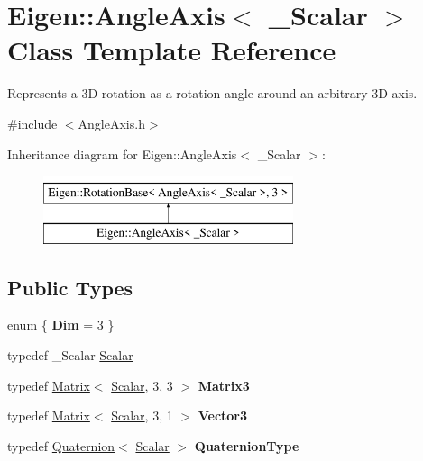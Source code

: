 \hypertarget{class_eigen_1_1_angle_axis}{}\section{Eigen\+::Angle\+Axis$<$ \+\_\+\+Scalar $>$ Class Template Reference}
\label{class_eigen_1_1_angle_axis}


Represents a 3D rotation as a rotation angle around an arbitrary 3D axis.  




{\ttfamily \#include $<$Angle\+Axis.\+h$>$}

Inheritance diagram for Eigen\+::Angle\+Axis$<$ \+\_\+\+Scalar $>$\+:\begin{figure}[H]
\begin{center}
\leavevmode
\includegraphics[height=2.000000cm]{class_eigen_1_1_angle_axis}
\end{center}
\end{figure}
\subsection*{Public Types}
\begin{DoxyCompactItemize}
\item 
\mbox{\label{class_eigen_1_1_angle_axis_aa4d3ccec7f40e12980333eb18a2315ab}} 
enum \{ {\bfseries Dim} = 3
 \}
\item 
typedef \+\_\+\+Scalar \mbox{\hyperlink{class_eigen_1_1_angle_axis_acd9b10692d7d726b28670e4d3a282fe8}{Scalar}}
\item 
\mbox{\label{class_eigen_1_1_angle_axis_acbafcda05b1dc5544e459f1b249c0b51}} 
typedef \mbox{\hyperlink{class_eigen_1_1_matrix}{Matrix}}$<$ \mbox{\hyperlink{class_eigen_1_1_angle_axis_acd9b10692d7d726b28670e4d3a282fe8}{Scalar}}, 3, 3 $>$ {\bfseries Matrix3}
\item 
\mbox{\label{class_eigen_1_1_angle_axis_a316eb5ec48f036e65a69c57c5ca16d96}} 
typedef \mbox{\hyperlink{class_eigen_1_1_matrix}{Matrix}}$<$ \mbox{\hyperlink{class_eigen_1_1_angle_axis_acd9b10692d7d726b28670e4d3a282fe8}{Scalar}}, 3, 1 $>$ {\bfseries Vector3}
\item 
\mbox{\label{class_eigen_1_1_angle_axis_ae79e8f152e2b922a2f7e26b0d0c2ee57}} 
typedef \mbox{\hyperlink{class_eigen_1_1_quaternion}{Quaternion}}$<$ \mbox{\hyperlink{class_eigen_1_1_angle_axis_acd9b10692d7d726b28670e4d3a282fe8}{Scalar}} $>$ {\bfseries Quaternion\+Type}
\end{DoxyCompactItemize}
